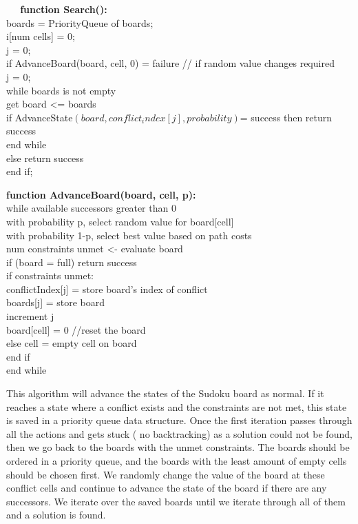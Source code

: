 \begin{singlespace}
$\>$$\>$$\>$$\>$$\>$ \textbf{function Search():} \\
boards = PriorityQueue of boards; \\
i[num cells] = 0; \\
j = 0; \\
if AdvanceBoard(board, cell, 0) = failure	// if random value changes required \\
j = 0; \\ 
while boards is not empty \\
get board <= boards \\
if AdvanceState$(board, conflict_index[j], probability)$= success then  return success \\
end while \\
else 	return success \\
end if; 


\textbf{function AdvanceBoard(board, cell, p):} \\
while available successors greater than 0 \\
with probability p, select random value for board[cell] \\
with probability 1-p, select best value based on path costs \\
num constraints unmet <- evaluate board \\
if (board = full) return success \\
if constraints unmet: \\
conflictIndex[j] = store board's index of conflict \\
boards[j] = store board \\
increment j \\ 
board[cell] = 0 		//reset the board \\
else	cell = empty cell on board \\
end if \\
end while 
\end{singlespace}

This algorithm will advance the states of the Sudoku board as normal. If it reaches a state where a conflict exists and the constraints are not met, this state is saved in a priority queue data structure. Once the first iteration passes  through all the actions and gets stuck ( no backtracking) as a solution could not be found, then we go back to the boards with the unmet constraints.
The boards should be ordered in a priority queue, and the boards with the least amount of empty cells should be chosen first. We randomly change the value of the board at these conflict cells and continue to advance the state of the board if there are any successors. We iterate over the saved boards until we iterate through all of them and a solution is found.

